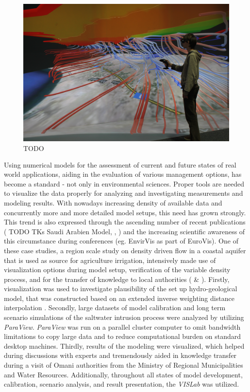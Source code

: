 \begin{figure}
  \includegraphics[width=\linewidth]{images/oman.jpg}
\caption{TODO}
\label{fig:oman}
\end{figure}

Using numerical models for the assessment of current and future states of real world applications, aiding in the evaluation of various management options, has become a standard - not only in environmental sciences. Proper tools are needed to visualize the data properly for analyzing and investigating measurements and modeling results. With nowadays increasing density of available data and concurrently more and more detailed model setups, this need has grown strongly. This trend is also expressed through the ascending number of recent publications ( TODO TKs Saudi Arabien Model, \cite{sun:ees}, \cite{helbig:envirvis}) and the increasing scientific awareness of this circumstance during conferences (eg. EnvirVis as part of EuroVis). One of these case studies, a region scale study on density driven flow in a coastal aquifer that is used as source for agriculture irrigation, intensively made use of visualization options during model setup, verification of the variable density process, and for the transfer of knowledge to local authorities (\cite{walther:cam} \& \cite{walther:eesenvirvis}). Firstly, visualization was used to investigate plausibility of the set up hydro-geological model, that was constructed based on an extended inverse weighting distance interpolation \cite{walther:modelcare}. Secondly, large datasets of model calibration and long term scenario simulations of the saltwater intrusion process were analyzed by utilizing \emph{ParaView}. \emph{ParaView} was run on a parallel cluster computer to omit bandwidth limitations to copy large data and to reduce computational burden on standard desktop machines. Thirdly, results of the modeling were visualized, which helped during discussions with experts and tremendously aided in knowledge transfer during a visit of Omani authorities from the Ministry of Regional Municipalities and Water Resources. Additionally, throughout all states of model development, calibration, scenario analysis, and result presentation, the \emph{VISLab} was
utilized.

